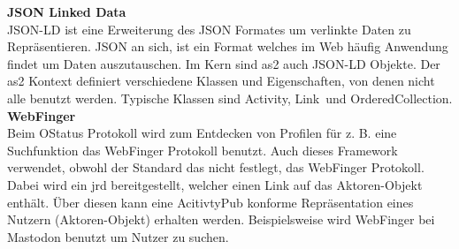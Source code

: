 {	\begingroup
		\fontsize{18pt}{12pt}\selectfont
		\textbf{JSON Linked Data}
		\vspace{4pt}
	\endgroup\\
	\gls{JSON-LD} ist eine Erweiterung des JSON Formates um verlinkte Daten zu Repräsentieren. JSON an sich, ist ein Format welches im Web häufig Anwendung findet um Daten auszutauschen. Im Kern sind \gls{as2} auch \gls{JSON-LD} Objekte. Der \gls{as2} Kontext definiert verschiedene Klassen und Eigenschaften, von denen nicht alle benutzt werden. Typische Klassen sind \glqq Activity\grqq, \glqq Link\grqq~und \glqq OrderedCollection\grqq.\\
	
	\begingroup
		\fontsize{18pt}{12pt}\selectfont
		\textbf{WebFinger}
		\vspace{4pt}
	\endgroup\\
	Beim OStatus Protokoll wird zum Entdecken von Profilen für z. B. eine Suchfunktion das WebFinger Protokoll benutzt. Auch dieses Framework verwendet, obwohl der Standard das nicht festlegt, das WebFinger Protokoll. Dabei wird ein \gls{jrd} bereitgestellt, welcher einen Link auf das Aktoren-Objekt enthält. Über diesen kann eine AcitivtyPub konforme Repräsentation eines Nutzern (Aktoren-Objekt) erhalten werden. Beispielsweise wird WebFinger bei Mastodon benutzt um Nutzer zu suchen.
}
